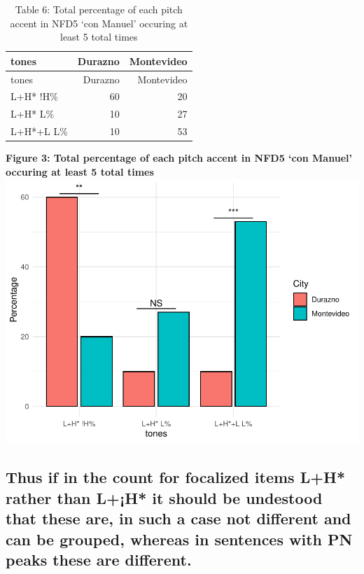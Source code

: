 \documentclass[
  man]{apa6}
\begin{document}
\begin{longtable}[]{@{}lrr@{}}
\caption{\label{tab:unnamed-chunk-10}Table 6: Total percentage of each pitch accent in NFD5 `con Manuel' occuring at least 5 total times}\tabularnewline
\toprule\noalign{}
tones & Durazno & Montevideo \\
\midrule\noalign{}
\endfirsthead
\toprule\noalign{}
tones & Durazno & Montevideo \\
\midrule\noalign{}
\endhead
\bottomrule\noalign{}
\endlastfoot
L+H* !H\% & 60 & 20 \\
L+H* L\% & 10 & 27 \\
L+H*+L L\% & 10 & 53 \\
\end{longtable}

\textbf{Figure 3: Total percentage of each pitch accent in NFD5 `con Manuel' occuring at least 5 total times}
\includegraphics{main_files/figure-latex/unnamed-chunk-11-1.pdf}

\hypertarget{thus-if-in-the-count-for-focalized-items-lh-rather-than-lh-it-should-be-undestood-that-these-are-in-such-a-case-not-different-and-can-be-grouped-whereas-in-sentences-with-pn-peaks-these-are-different.}{%
\subsection{Thus if in the count for focalized items L+H* rather than L+¡H* it should be undestood that these are, in such a case not different and can be grouped, whereas in sentences with PN peaks these are different.}\label{thus-if-in-the-count-for-focalized-items-lh-rather-than-lh-it-should-be-undestood-that-these-are-in-such-a-case-not-different-and-can-be-grouped-whereas-in-sentences-with-pn-peaks-these-are-different.}}
\end{document}
